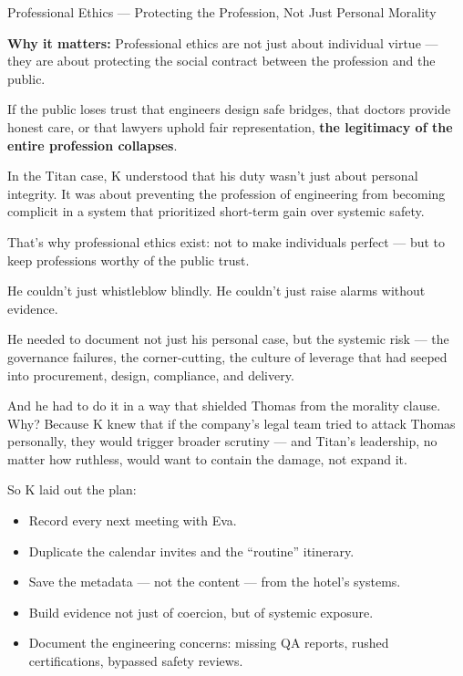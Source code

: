 \begin{HistoricalSidebar}{Professional Ethics --- Protecting the Profession, Not Just Personal Morality}
    \medskip
    
    \textbf{Why it matters:} Professional ethics are not just about individual virtue — they are about protecting the social contract between the profession and the public.

    \medskip
    
    If the public loses trust that engineers design safe bridges, that doctors provide honest care, or that lawyers uphold fair representation,  \textbf{the legitimacy of the entire profession collapses}.
    
    \medskip
    
    In the Titan case, K understood that his duty wasn’t just about personal integrity.  
    It was about preventing the profession of engineering from becoming complicit in a system that prioritized short-term gain over systemic safety.

    \medskip
    
    That’s why professional ethics exist:  
    not to make individuals perfect — but to keep professions worthy of the public trust.
    
\end{HistoricalSidebar}

\medskip

He couldn’t just whistleblow blindly.  He couldn’t just raise alarms without evidence.

He needed to document not just his personal case,
but the systemic risk —
the governance failures, the corner-cutting, the culture of leverage that had seeped into procurement, design, compliance, and delivery.

And he had to do it in a way that shielded Thomas from the morality clause.
Why?
Because K knew that if the company’s legal team tried to attack Thomas personally,
they would trigger broader scrutiny —
and Titan’s leadership, no matter how ruthless, would want to contain the damage, not expand it.

So K laid out the plan:

\begin{itemize}
    \item Record every next meeting with Eva.
    \item Duplicate the calendar invites and the “routine” itinerary.
    \item Save the metadata — not the content — from the hotel’s systems.
    \item Build evidence not just of coercion, but of systemic exposure.
    \item Document the engineering concerns: missing QA reports, rushed certifications, bypassed safety reviews.
\end{itemize}

